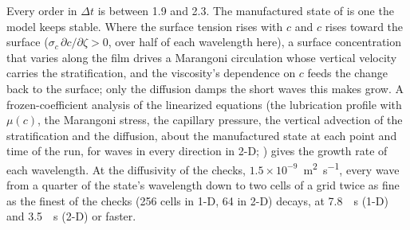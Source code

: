 Every order in $\Delta t$ is between 1.9 and 2.3. The manufactured state of
 is one the model keeps stable. Where the surface tension
rises with $c$ and $c$ rises toward the surface ($\sigma_c\,\partial
c/\partial\zeta > 0$, over half of each wavelength here), a surface
concentration that varies along the film drives a Marangoni circulation whose
vertical velocity carries the stratification, and the viscosity's dependence
on $c$ feeds the change back to the surface; only the diffusion damps the
short waves this makes grow. A frozen-coefficient analysis of the linearized
equations (the lubrication profile with $\mu(c)$, the Marangoni stress, the
capillary pressure, the vertical advection of the stratification and the
diffusion, about the manufactured state at each point and time of the run,
for waves in every direction in 2-D; ) gives
the growth rate of each wavelength. At the diffusivity of the checks,
$1.5\times10^{-9}$~\si{\metre\squared\per\second}, every wave from a quarter
of the state's wavelength down to two cells of a grid twice as fine as the
finest of the checks (256 cells in 1-D, 64 in 2-D) decays, at
\SI{7.8}{\per\second} (1-D) and \SI{3.5}{\per\second} (2-D) or faster.


